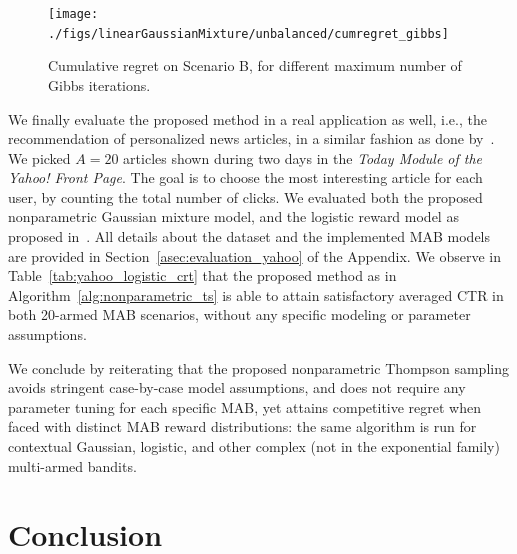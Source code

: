 \documentclass{article}
\newcommand{\ie}{i.e., }
\begin{document}
\begin{figure}[!h]
	\centering
	\texttt{[image: ./figs/linearGaussianMixture/unbalanced/cumregret\_gibbs]}
	\caption{Cumulative regret on Scenario B, for different maximum number of Gibbs iterations.}
	\label{fig:cumregret_gibbs}
\vspace*{-1ex}
\end{figure}

We finally evaluate the proposed method in a real application as well, \ie the recommendation of personalized news articles, in a similar fashion as done by~\citet{ic-Chapelle2011}. We picked $A=20$ articles shown during two days in the \textit{Today Module of the Yahoo! Front Page}.
The goal is to choose the most interesting article for each user, by counting the total number of clicks. We evaluated both the proposed nonparametric Gaussian mixture model, and the logistic reward model as proposed in~\cite{ic-Chapelle2011,ic-Dumitrascu2018}. All details about the dataset and the implemented MAB models are provided in Section~\ref{asec:evaluation_yahoo} of the Appendix. We observe in Table~\ref{tab:yahoo_logistic_crt} that the proposed method as in Algorithm~\ref{alg:nonparametric_ts} is able to attain satisfactory averaged CTR in both 20-armed MAB scenarios, without any specific modeling or parameter assumptions.



We conclude by reiterating that the proposed nonparametric Thompson sampling avoids stringent case-by-case model assumptions, and does not require any parameter tuning for each specific MAB, yet attains competitive regret when faced with distinct MAB reward distributions: the same algorithm is run for contextual Gaussian, logistic, and other complex (not in the exponential family) multi-armed bandits.

\section{Conclusion}
\label{sec:conclusion}
\end{document}
